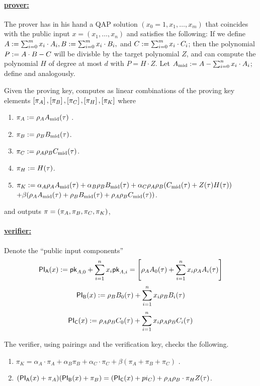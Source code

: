 \documentclass[11pt]{article}
\numberwithin{figure}{section} %
\begin{document}
\paragraph{\underline{prover:}\\}
The prover has in his hand a QAP solution $(x_0=1,x_1,\ldots,x_m)$ that coincides with the public input $x=(x_1,\ldots,x_n)$ and satisfies the following:
If we define $A:= \sum_{i=0}^m x_i\cdot A_i, B:= \sum_{i=0}^m x_i \cdot B_i,$ and $C:= \sum_{i=0}^m x_i \cdot C_i$;
then the polynomial $P:= A\cdot B - C$ will be divisble by the target polynomial $Z$, and \per can compute the polynomial $H$ of degree at most $d$ with $P=H\cdot Z$. Let $A_{\mathrm{mid}}:= A -\sum_{i=0}^n x_i\cdot A_i$; define \midb and \midc analogously.

Given the proving key, \per computes as linear combinations of the proving key elements $\left[\pi_A\right],\left[\pi_B\right],\left[\pi_C\right],\left[\pi_H\right],\left[\pi_K\right]$ where 
\begin{enumerate}
\item $\pi_A:= \rho_A A_{\mathrm{mid}}(\tau)$ .
\item $\pi_B:= \rho_B B_{\mathrm{mid}}(\tau)$.
\item $\pi_C:= \rho_A\rho_B C_{\mathrm{mid}}(\tau)$.
\item $\pi_H:= H(\tau)$.
\item $\pi_K:= \alpha_A \rho_AA_{\mathrm{mid}}(\tau) + \alpha_B \rho_BB_{\mathrm{mid}}(\tau) + \alpha_C\rho_A\rho_B(C_{\mathrm{mid}}(\tau)+ Z(\tau)H(\tau))$
$+ \beta(\rho_AA_{\mathrm{mid}}(\tau)+\rho_BB_{\mathrm{mid}}(\tau) + \rho_A\rho_BC_{\mathrm{mid}}(\tau))$.
\end{enumerate}
 and outputs $\pi = (\pi_A,\pi_B,\pi_C,\pi_K)$,
 

\paragraph{\underline{verifier:}\\}
Denote the ``public input components'' 
\[ \mathsf{PI_A}(x) := \mathsf{pk}_{A,0} + \sum_{i=1}^n x_i \mathsf{pk}_{A,i} = \left[\rho_A A_0(\tau) + \sum_{i=1}^n x_i \rho_A A_i(\tau) \right]\]
\[ \mathsf{PI_B}(x) :=  \rho_B B_0(\tau) + \sum_{i=1}^n x_i \rho_B B_i(\tau) \]
\[ \mathsf{PI_C}(x) := \rho_A\rho_B C_0(\tau) + \sum_{i=1}^n x_i \rho_A\rho_B C_i(\tau) \]

 The verifier, using pairings and the verification key, checks the following.
\begin{enumerate}
\item $\pi_K =     \alpha_A\cdot \pi_A+ \alpha_B\pi_B+\alpha_C\cdot \pi_C+ \beta(\pi_A+\pi_B+\pi_C)$
.
\item $(\mathsf{PI_A}(x)+\pi_A)(\mathsf{PI_B}(x)+\pi_B)= (\mathsf{PI_C}(x)+pi_C)+\rho_A\rho_B\cdot \pi_H Z(\tau)$.
 \end{enumerate}
\end{document}
